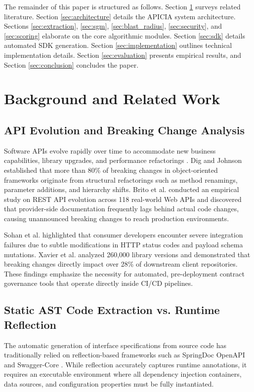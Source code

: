 \documentclass[conference]{IEEEtran}
\begin{document}
The remainder of this paper is structured as follows. Section \ref{sec:related_work} surveys related literature. Section \ref{sec:architecture} details the APICIA system architecture. Sections \ref{sec:extraction}, \ref{sec:sgm}, \ref{sec:blast_radius}, \ref{sec:security}, and \ref{sec:scoring} elaborate on the core algorithmic modules. Section \ref{sec:sdk} details automated SDK generation. Section \ref{sec:implementation} outlines technical implementation details. Section \ref{sec:evaluation} presents empirical results, and Section \ref{sec:conclusion} concludes the paper.

\section{Background and Related Work}
\label{sec:related_work}

\subsection{API Evolution and Breaking Change Analysis}
Software APIs evolve rapidly over time to accommodate new business capabilities, library upgrades, and performance refactorings \cite{dig2006apis, linares2014api}. Dig and Johnson \cite{dig2006apis} established that more than 80\% of breaking changes in object-oriented frameworks originate from structural refactorings such as method renamings, parameter additions, and hierarchy shifts. Brito et al. \cite{brito2018web} conducted an empirical study on REST API evolution across 118 real-world Web APIs and discovered that provider-side documentation frequently lags behind actual code changes, causing unannounced breaking changes to reach production environments. 

Sohan et al. \cite{sohan2015case} highlighted that consumer developers encounter severe integration failures due to subtle modifications in HTTP status codes and payload schema mutations. Xavier et al. \cite{xavier2017historical} analyzed 260,000 library versions and demonstrated that breaking changes directly impact over 28\% of downstream client repositories. These findings emphasize the necessity for automated, pre-deployment contract governance tools that operate directly inside CI/CD pipelines.

\subsection{Static AST Code Extraction vs. Runtime Reflection}
The automatic generation of interface specifications from source code has traditionally relied on reflection-based frameworks such as SpringDoc OpenAPI and Swagger-Core \cite{wittern2017generating}. While reflection accurately captures runtime annotations, it requires an executable environment where all dependency injection containers, data sources, and configuration properties must be fully instantiated. 
\end{document}
